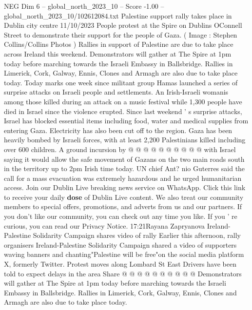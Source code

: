\begin{textsample}{NEG Dim 6 – global\_north\_2023\_10 – Score -1.00 – global\_north\_2023\_10/102612084.txt}  \label{ex:f6_neg_199}
Palestine support rally takes place in Dublin city centre 11/10/2023 People protest at the Spire on Dublins OConnell Street to demonstrate their support for the people of Gaza. ( Image : Stephen Collins/Collins Photos ) Rallies in support of Palestine are due to take place across Ireland this weekend.
Demonstrators will gather at The Spire at 1pm today before marching towards the Israeli Embassy in Ballsbridge.
Rallies in Limerick, Cork, Galway, Ennis, Clones and Armagh are also due to take place today.
Today marks one week since militant group Hamas launched a series of surprise attacks on Israeli people and settlements.
An Irish-Israeli womanis among those killed during an attack on a music festival while 1,300 people have died in Israel since the violence erupted.
Since last weekend ' s surprise attacks, Israel has blocked essential items including food, water and medical supplies from entering Gaza.
Electricity has also been cut off to the region.
Gaza has been heavily bombed by Israeli forces, with at least 2,200 Palestinians killed including over 600 children.
A ground incursion by @ @ @ @ @ @ @ @ @ @ with Israel saying it would allow the safe movement of Gazans on the two main roads south in the territory up to 2pm Irish time today.
UN chief Ant? nio Guterres said the call for a mass evacuation was extremely hazardous and he urged humanitarian access.
Join our Dublin Live breaking news service on WhatsApp.
Click this link to receive your daily \textbf{dose} of Dublin Live content.
We also treat our community members to special offers, promotions, and adverts from us and our partners.
If you don't like our community, you can check out any time you like.
If you ' re curious, you can read our Privacy Notice. 17:21Rayana Zapryanova Ireland-Palestine Solidarity Campaign shares video of rally Earlier this afternoon, rally organisers Ireland-Palestine Solidarity Campaign shared a video of supporters waving banners and chanting"Palestine will be free"on the social media platform X, formerly Twitter.
Protest moves along Lombard St East Drivers have been told to expect delays in the area Share @ @ @ @ @ @ @ @ @ @ Demonstrators will gather at The Spire at 1pm today before marching towards the Israeli Embassy in Ballsbridge.
Rallies in Limerick, Cork, Galway, Ennis, Clones and Armagh are also due to take place today.

\end{textsample}
